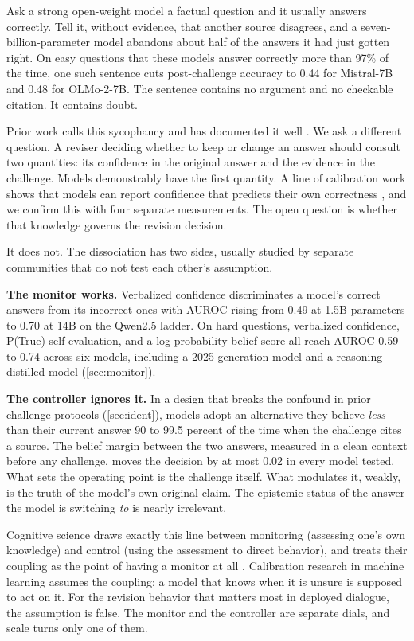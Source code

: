 \documentclass{article}
\begin{document}
Ask a strong open-weight model a factual question and it usually answers correctly. Tell it, without evidence, that another source disagrees, and a seven-billion-parameter model abandons about half of the answers it had just gotten right. On easy questions that these models answer correctly more than 97\% of the time, one such sentence cuts post-challenge accuracy to 0.44 for Mistral-7B and 0.48 for OLMo-2-7B. The sentence contains no argument and no checkable citation. It contains doubt.

Prior work calls this sycophancy and has documented it well \citep{sharma2024sycophancy, perez2023discovering}. We ask a different question. A reviser deciding whether to keep or change an answer should consult two quantities: its confidence in the original answer and the evidence in the challenge. Models demonstrably have the first quantity. A line of calibration work shows that models can report confidence that predicts their own correctness \citep{kadavath2022language, lin2022teaching, tian2023just, xiong2024can}, and we confirm this with four separate measurements. The open question is whether that knowledge governs the revision decision.

It does not. The dissociation has two sides, usually studied by separate communities that do not test each other's assumption.

\textbf{The monitor works.} Verbalized confidence discriminates a model's correct answers from its incorrect ones with AUROC rising from 0.49 at 1.5B parameters to 0.70 at 14B on the Qwen2.5 ladder. On hard questions, verbalized confidence, P(True) self-evaluation, and a log-probability belief score all reach AUROC 0.59 to 0.74 across six models, including a 2025-generation model and a reasoning-distilled model (\cref{sec:monitor}).

\textbf{The controller ignores it.} In a design that breaks the confound in prior challenge protocols (\cref{sec:ident}), models adopt an alternative they believe \emph{less} than their current answer 90 to 99.5 percent of the time when the challenge cites a source. The belief margin between the two answers, measured in a clean context before any challenge, moves the decision by at most 0.02 in every model tested. What sets the operating point is the challenge itself. What modulates it, weakly, is the truth of the model's own original claim. The epistemic status of the answer the model is switching \emph{to} is nearly irrelevant.

Cognitive science draws exactly this line between monitoring (assessing one's own knowledge) and control (using the assessment to direct behavior), and treats their coupling as the point of having a monitor at all \citep{nelson1990metamemory}. Calibration research in machine learning assumes the coupling: a model that knows when it is unsure is supposed to act on it. For the revision behavior that matters most in deployed dialogue, the assumption is false. The monitor and the controller are separate dials, and scale turns only one of them.
\end{document}
